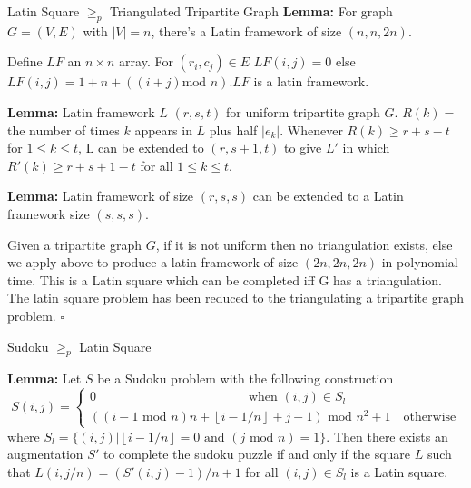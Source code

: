 \documentclass[final]{beamer}
\newlength{\colwidth}
\newcounter{col}
\begin{document}
\begin{frame}[t]
\begin{columns}[t]
\begin{column}{\colwidth}
\begin{block}{Latin Square $\geq_p$ Triangulated Tripartite Graph}
\textbf{Lemma:} For graph $G=(V,E)$ with $|V|=n$, there's a Latin framework of size $(n,n,2n)$.

Define $LF$ an $n \times n$ array. For $(r_i,c_j)\in E$ $LF(i,j)=0$ else $LF(i,j)=1+n+((i+j)\text{mod }n)$.$ LF$ is a latin framework. 

\textbf{Lemma:} Latin framework $L$  $(r,s,t)$ for uniform tripartite graph $G$. $R(k) =$ the number of times $k$ appears in $L$ plus half $|e_k|$. Whenever $R(k)\ge r+s-t$ for $1 \le k \le t$, L can be extended to $(r,s+1,t)$ to give $L'$ in which $R'(k)\ge r + s+1-t$ for all $1\le k \le t$.

\textbf{Lemma:} Latin framework of size $(r,s,s)$ can be extended to a Latin framework size $(s,s,s)$.

Given a tripartite graph $G$, if it is not uniform then no triangulation exists, else we apply above to produce a latin framework of size $(2n,2n,2n)$ in polynomial time. This is a Latin square which can be completed iff G has a triangulation. The latin square problem has been reduced to the triangulating a tripartite graph problem. $\square$

  \end{block}
\begin{block}{Sudoku $\geq_p$ Latin Square}

\textbf{Lemma:} Let $S$ be a Sudoku problem with the following construction 
\begin{equation}
	S(i,j) =\begin{cases}
0 \qquad\qquad\qquad\qquad\qquad\qquad\text{when } (i,j) \in S_l \\ 
((i-1 \text{ mod } n)n + \left\lfloor{i-1/n}\right\rfloor+j-1)\text{ mod } n^2 +1 \quad\text{otherwise}
\end{cases}
\end{equation}
where $S_l=\{(i,j)| \left\lfloor{i-1/n}\right\rfloor=0 \text{ and }(j \text{ mod }n)=1\}$. Then there exists an augmentation $S'$ to complete the sudoku puzzle if and only if the square $L$ such that $L(i,j/n)=(S'(i,j)-1)/n+1$ for all $(i,j) \in S_l$ is a Latin square.


\end{block}
\end{column}
\end{columns}
\end{frame}
\end{document}
